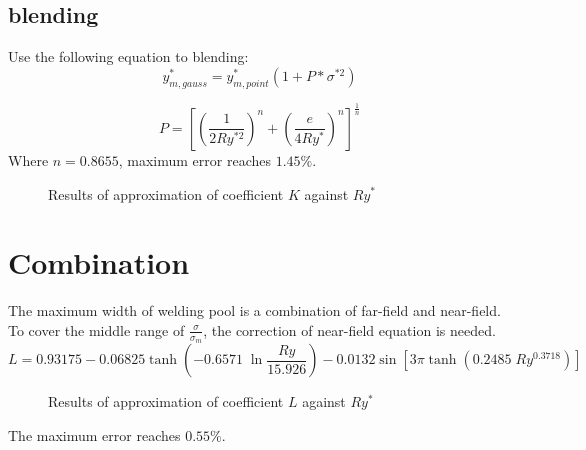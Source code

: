 \documentclass[review, 1p, number, sort&compress,table]{elsarticle}
\begin{document}
	\subsection{blending}
	Use the following equation to blending:
	\begin{equation} \label{eq:blending s/s}
		y^{*}_{m,gauss}=y^{*}_{m,point}\left(1+P*\sigma^{*2}\right)
	\end{equation}
	
	\begin{equation}
		P=\left[\left( \frac{1}{2Ry^{*2}}\right)^n+  \left( \frac{e}{4Ry^{*}}\right)^n  \right]^{\frac{1}{n}}
	\end{equation}
	Where $n=0.8655$, maximum error reaches $1.45\%$.
		\begin{figure*}[ht!]
			\begin{center}
			\end{center}
			\caption{Results of approximation of coefficient $K$ against $Ry^{*}$  }
			\label{fig:A.PvR}
			
		\end{figure*}
	\section{Combination}
	The maximum width of welding pool is a combination of far-field and near-field. To cover the middle range of $\frac{\sigma}{\sigma_m}$, the correction of near-field equation is needed.
	\begin{equation}  \label{eq:LvR}
    L=	0.93175-0.06825\tanh\left({-0.6571 \; \ln\dfrac{Ry}{15.926}}\right)-0.0132\sin\left[3{\pi}\tanh\left(0.2485 \; Ry^{0.3718}\right)\right]
	\end{equation}
	
		\begin{figure*}[ht!]
			\begin{center}
			\end{center}
			\caption{Results of approximation of coefficient $L$ against $Ry^{*}$  }
			\label{fig:A.LvR}
		\end{figure*}
   The maximum error reaches $0.55\%$. 
   
\end{document}
